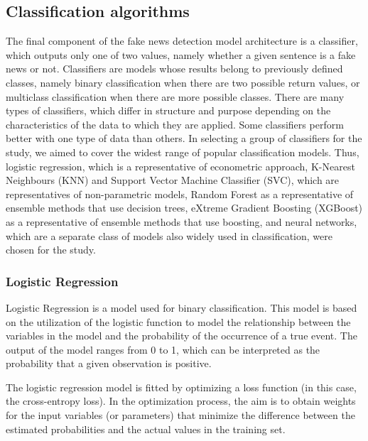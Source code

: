 \subsection{Classification algorithms}
The final component of the fake news detection model architecture is a classifier, which outputs only one of two values, namely whether a given sentence is a fake news or not. Classifiers are models whose results belong to previously defined classes, namely binary classification when there are two possible return values, or multiclass classification when there are more possible classes. There are many types of classifiers, which differ in structure and purpose depending on the characteristics of the data to which they are applied. Some classifiers perform better with one type of data than others. In selecting a group of classifiers for the study, we aimed to cover the widest range of popular classification models. Thus, logistic regression, which is a representative of econometric approach, K-Nearest Neighbours (KNN) and Support Vector Machine Classifier (SVC), which are representatives of non-parametric models, Random Forest as a representative of ensemble methods that use decision trees, eXtreme Gradient Boosting (XGBoost) as a representative of ensemble methods that use boosting, and neural networks, which are a separate class of models also widely used in classification, were chosen for the study.

\subsubsection{Logistic Regression}

Logistic Regression is a model used for binary classification. This model is based on the utilization of the logistic function to model the relationship between the variables in the model and the probability of the occurrence of a true event. The output of the model ranges from 0 to 1, which can be interpreted as the probability that a given observation is positive.

The logistic regression model is fitted by optimizing a loss function (in this case, the cross-entropy loss). In the optimization process, the aim is to obtain weights for the input variables (or parameters) that minimize the difference between the estimated probabilities and the actual values in the training set.

